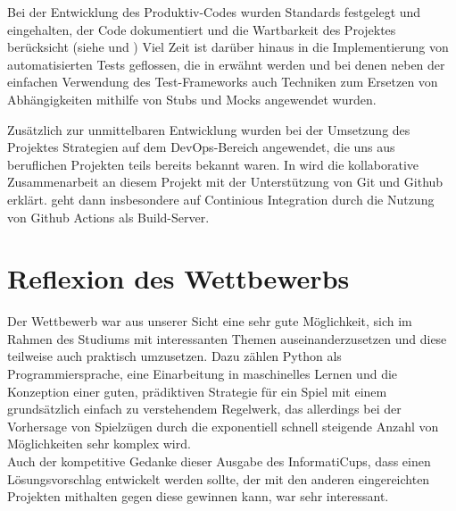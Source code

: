 Bei der Entwicklung des Produktiv-Codes wurden \ua Standards festgelegt und eingehalten, der Code dokumentiert und die
Wartbarkeit des Projektes berücksicht (siehe  und )
Viel Zeit ist darüber hinaus in die Implementierung von automatisierten Tests geflossen, die in 
erwähnt werden und bei denen neben der einfachen Verwendung des Test-Frameworks auch Techniken zum Ersetzen von
Abhängigkeiten mithilfe von Stubs und Mocks angewendet wurden.

Zusätzlich zur unmittelbaren Entwicklung wurden bei der Umsetzung des Projektes Strategien auf dem DevOps-Bereich
angewendet, die uns aus beruflichen Projekten teils bereits bekannt waren.
In  wird die kollaborative Zusammenarbeit an diesem Projekt mit der
Unterstützung von Git und Github erklärt.
 geht dann insbesondere auf Continious Integration durch die Nutzung von Github Actions
als Build-Server. \\


\section{Reflexion des Wettbewerbs}
\label{sec:reflexion}

Der Wettbewerb war aus unserer Sicht eine sehr gute Möglichkeit, sich im Rahmen des Studiums mit interessanten Themen
auseinanderzusetzen und diese teilweise auch praktisch umzusetzen.
Dazu zählen \ua Python als Programmiersprache, eine Einarbeitung in maschinelles Lernen und die Konzeption einer
guten, prädiktiven Strategie für ein Spiel mit einem grundsätzlich einfach zu verstehendem Regelwerk, das allerdings
bei der Vorhersage von Spielzügen durch die exponentiell schnell steigende Anzahl von Möglichkeiten sehr komplex wird.
\\

Auch der kompetitive Gedanke dieser Ausgabe des InformatiCups, dass einen Lösungsvorschlag entwickelt werden sollte,
der mit den anderen eingereichten Projekten mithalten \bzw gegen diese gewinnen kann, war sehr interessant.
